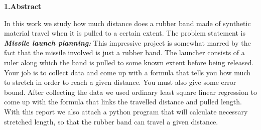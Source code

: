 \begin{center}
\textbf{{\huge 1.Abstract}}
\end{center}
\vspace{ 2 mm}
In this work we study how much distance does a rubber band made of synthetic material travel when it is pulled to a certain extent. The problem statement is             
\textbf{\textit{Missile launch planning:}} This impressive project is somewhat marred by the fact that the missile involved is just a rubber band. The launcher consists of a ruler along which the band is pulled to some known extent before being released. Your job is to collect data and come up with a formula that tells you how much to stretch in order to reach a given distance. You must also give some error bound. After collecting the data we used ordinary least square linear regression to come up with the formula that links the travelled distance and pulled length. With this report we also attach a python program that will calculate necessary stretched length, so that the rubber band can travel a given distance.\newline
\vspace{ 4 mm}
